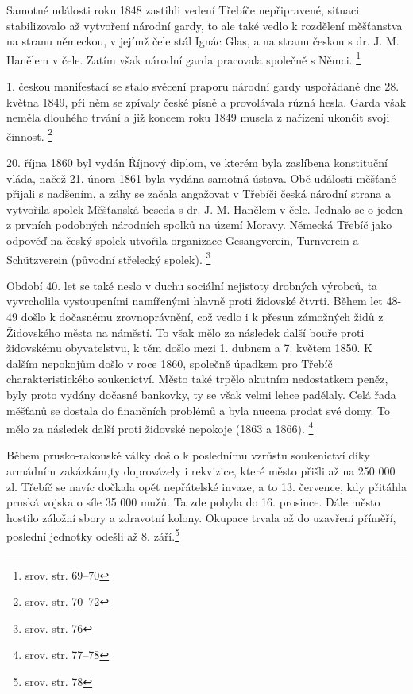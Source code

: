 \documentclass[a4paper,oneside,12pt]{report}
\begin{document}
Samotné události roku 1848 zastihli vedení Třebíče nepřipravené, situaci stabilizovalo až vytvoření národní gardy, to ale také vedlo k rozdělení měšťanstva na stranu německou, v jejímž čele stál Ignác Glas, a na stranu českou s dr. J. M. Hanělem v čele.
Zatím však národní garda pracovala společně s Němci. \footnote{srov. \cite{Janak1981} str. 69--70}

1. českou manifestací se stalo svěcení praporu národní gardy uspořádané dne 28. května 1849, při něm se zpívaly české písně a provolávala různá hesla.
Garda však neměla dlouhého trvání a již koncem roku 1849 musela z nařízení ukončit svoji činnost. \footnote{srov. \cite{Janak1981} str. 70--72}

20. října 1860 byl vydán Říjnový diplom, ve kterém byla zaslíbena konstituční vláda, načež 21. února 1861 byla vydána samotná ústava.
Obě události měšťané přijali s nadšením, a záhy se začala angažovat v Třebíči česká národní strana a vytvořila spolek Měšťanská beseda s dr. J. M. Hanělem v čele.
Jednalo se o jeden z prvních podobných národních spolků na území Moravy.
Německá Třebíč jako odpověď na český spolek utvořila organizace Gesangverein, Turnverein a Schützverein (původní střelecký spolek). \footnote{srov. \cite{Janak1981} str. 76}

Období 40. let se také neslo v duchu sociální nejistoty drobných výrobců, ta vyvrcholila vystoupeními namířenými hlavně proti židovské čtvrti.
Během let 48-49 došlo k dočasnému zrovnoprávnění, což vedlo i k přesun zámožných židů z Židovského města na náměstí.
To však mělo za následek další bouře proti židovskému obyvatelstvu, k těm došlo mezi 1. dubnem a 7. květem 1850.
K dalším nepokojům došlo v roce 1860, společně úpadkem pro Třebíč charakteristického soukenictví.
Město také trpělo akutním nedostatkem peněz, byly proto vydány dočasné bankovky, ty se však velmi lehce padělaly.
Celá řada měšťanů se dostala do finančních problémů a byla nucena prodat své domy.
To mělo za následek další proti židovské nepokoje (1863 a 1866). \footnote{srov. \cite{Janak1981} str. 77--78}

Během prusko-rakouské války došlo k poslednímu vzrůstu soukenictví díky armádním zakázkám,ty doprovázely i rekvizice, které město přišli až na 250 000 zl.
Třebíč se navíc dočkala opět nepřátelské invaze, a to 13. července, kdy přitáhla pruská vojska o síle 35 000 mužů.
Ta zde pobyla do 16. prosince.
Dále město hostilo záložní sbory a zdravotní kolony.
Okupace trvala až do uzavření příměří, poslední jednotky odešli až 8. září.\footnote{srov. \cite{Janak1981} str. 78}
\end{document}
